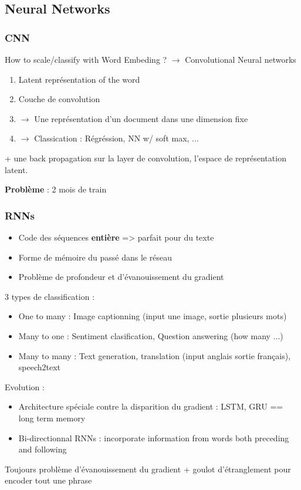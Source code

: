 \documentclass{article}
\theoremstyle{plain}%
\theoremstyle{definition}
\theoremstyle{remark}
\begin{document}
\subsection{Neural Networks}
\subsubsection{CNN}
How to scale/classify with Word Embeding ? $\rightarrow$ Convolutional Neural networks
\begin{enumerate}
    \item Latent représentation of the word 
    \item Couche de convolution
    \item $\rightarrow$ Une représentation d'un document dans une dimension fixe
    \item $\rightarrow$ Classication : Régréssion, NN w/ soft max, ...
\end{enumerate}
+ une back propagation sur la layer de convolution, l'espace de représentation latent. 

\textbf{Problème} : 2 mois de train 

\subsubsection{RNNs}
\begin{itemize}
    \item Code des séquences \textbf{entière} => parfait pour du texte
    \item Forme de mémoire du passé dans le réseau
    \item Problème de profondeur et d'évanouissement du gradient
\end{itemize}
3 types de classification :
\begin{itemize}
    \item One to many : Image captionning (input une image, sortie plusieurs mots)
    \item Many to one : Sentiment clasification, Question answering (how many ...)
    \item Many to many : Text generation, translation (input anglais sortie français), speech2text 
\end{itemize}
Evolution : 
\begin{itemize}
    \item Architecture spéciale contre la disparition du gradient : LSTM, GRU == long term memory 
    \item Bi-directionnal RNNs : incorporate information from words both preceding and following
\end{itemize}
Toujours problème d'évanouissement du gradient + goulot d'étranglement pour encoder tout une phrase
\end{document}
